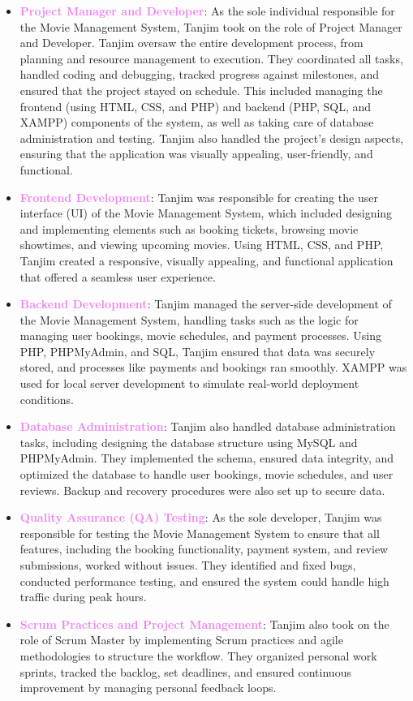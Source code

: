 \documentclass[a4paper,12pt]{article}  %
\renewcommand{\textbf}[1]{\textcolor{violet}{\bfseries #1}}
\begin{document}
\begin{itemize}
    \item \textbf{Project Manager and Developer}: As the sole individual responsible for the Movie Management System, Tanjim took on the role of Project Manager and Developer. Tanjim oversaw the entire development process, from planning and resource management to execution. They coordinated all tasks, handled coding and debugging, tracked progress against milestones, and ensured that the project stayed on schedule. This included managing the frontend (using HTML, CSS, and PHP) and backend (PHP, SQL, and XAMPP) components of the system, as well as taking care of database administration and testing. Tanjim also handled the project's design aspects, ensuring that the application was visually appealing, user-friendly, and functional.
    
    \item \textbf{Frontend Development}: Tanjim was responsible for creating the user interface (UI) of the Movie Management System, which included designing and implementing elements such as booking tickets, browsing movie showtimes, and viewing upcoming movies. Using HTML, CSS, and PHP, Tanjim created a responsive, visually appealing, and functional application that offered a seamless user experience.
    
    \item \textbf{Backend Development}: Tanjim managed the server-side development of the Movie Management System, handling tasks such as the logic for managing user bookings, movie schedules, and payment processes. Using PHP, PHPMyAdmin, and SQL, Tanjim ensured that data was securely stored, and processes like payments and bookings ran smoothly. XAMPP was used for local server development to simulate real-world deployment conditions.
    
    \item \textbf{Database Administration}: Tanjim also handled database administration tasks, including designing the database structure using MySQL and PHPMyAdmin. They implemented the schema, ensured data integrity, and optimized the database to handle user bookings, movie schedules, and user reviews. Backup and recovery procedures were also set up to secure data.
    
    \item \textbf{Quality Assurance (QA) Testing}: As the sole developer, Tanjim was responsible for testing the Movie Management System to ensure that all features, including the booking functionality, payment system, and review submissions, worked without issues. They identified and fixed bugs, conducted performance testing, and ensured the system could handle high traffic during peak hours.
    
    \item \textbf{Scrum Practices and Project Management}: Tanjim also took on the role of Scrum Master by implementing Scrum practices and agile methodologies to structure the workflow. They organized personal work sprints, tracked the backlog, set deadlines, and ensured continuous improvement by managing personal feedback loops.
\end{itemize}
\end{document}
